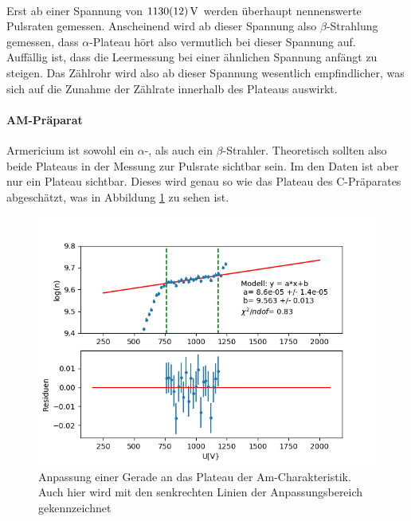 \documentclass[12pt,a4paper]{article}
\begin{document}
\\
Erst ab einer Spannung von $\SI{1130\pm 12}{V}$ werden überhaupt nennenswerte Pulsraten gemessen. Anscheinend wird ab dieser Spannung also $\beta$-Strahlung gemessen, dass $\alpha$-Plateau hört also vermutlich bei dieser Spannung auf.\\
Auffällig ist, dass die Leermessung bei einer ähnlichen Spannung anfängt zu steigen. Das Zählrohr wird also ab dieser Spannung wesentlich empfindlicher, was sich auf die Zunahme der Zählrate innerhalb des Plateaus auswirkt.

\paragraph{AM-Präparat}
Armericium ist sowohl ein $\alpha$-, als auch ein $\beta$-Strahler. Theoretisch sollten also beide Plateaus in der Messung zur Pulsrate sichtbar sein. Im den Daten ist aber nur ein Plateau sichtbar. Dieses wird genau so wie das Plateau des C-Präparates abgeschätzt, was in Abbildung \ref{fig:AMPlateau} zu sehen ist.

\begin{figure}
\centering
\includegraphics[scale=0.8]{Bilder/Prop/Am_plateau.PNG}
\caption{Anpassung einer Gerade an das Plateau der Am-Charakteristik. Auch hier wird mit den senkrechten Linien der Anpassungsbereich gekennzeichnet}
\label{fig:AMPlateau}
\end{figure}
\end{document}
